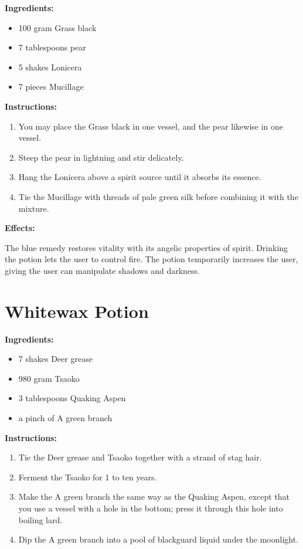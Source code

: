 \documentclass{article}
\begin{document}
\textbf{Ingredients:}

\begin{itemize}
  \item 100 gram Grass black
  \item 7 tablespoons pear
  \item 5 shakes Lonicera
  \item 7 pieces Mucillage
\end{itemize}

\textbf{Instructions:}

\begin{enumerate}
  \item You may place the Grass black in one vessel, and the pear likewise in one vessel.
  \item Steep the pear in lightning and stir delicately.
  \item Hang the Lonicera above a spirit source until it absorbs its essence.
  \item Tie the Mucillage with threads of pale green silk before combining it with the mixture.
\end{enumerate}

\textbf{Effects:}

The blue remedy restores vitality with its angelic properties of spirit. Drinking the potion lets the user to control fire. The potion temporarily increases the user, giving the user can manipulate shadows and darkness.

\newpage
\section*{Whitewax Potion}

\textbf{Ingredients:}

\begin{itemize}
  \item 7 shakes Deer grease
  \item 980 gram Tsaoko
  \item 3 tablespoons Quaking Aspen
  \item a pinch of A green branch
\end{itemize}

\textbf{Instructions:}

\begin{enumerate}
  \item Tie the Deer grease and Tsaoko together with a strand of stag hair.
  \item Ferment the Tsaoko for 1 to ten years.
  \item Make the A green branch the same way as the Quaking Aspen, except that you use a vessel with a hole in the bottom; press it through this hole into boiling lard.
  \item Dip the A green branch into a pool of blackguard liquid under the moonlight.
\end{enumerate}
\end{document}
